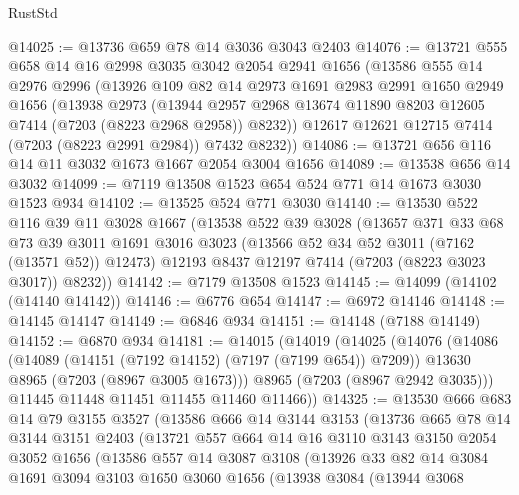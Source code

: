 \begin{lexlean}{RustStd}
\begin{coremodule}
@14025 := @13736 @659 @78 @14 @3036 @3043 @2403
@14076 := @13721
    @555
    @658
    @14
    @16
    @2998
    @3035
    @3042
    @2054
    @2941
    @1656
    (@13586
      @555
      @14
      @2976
      @2996
      (@13926
        @109
        @82
        @14
        @2973
        @1691
        @2983
        @2991
        @1650
        @2949
        @1656
        (@13938
          @2973
          (@13944 @2957 @2968 @13674 @11890 @8203 @12605 @7414 (@7203 (@8223 @2968 @2958)) @8232))
        @12617
        @12621
        @12715
        @7414
        (@7203 (@8223 @2991 @2984))
        @7432
        @8232))
@14086 := @13721 @656 @116 @14 @11 @3032 @1673 @1667 @2054 @3004 @1656
@14089 := @13538 @656 @14 @3032
@14099 := @7119 @13508 @1523 @654 @524 @771 @14 @1673 @3030 @1523 @934
@14102 := @13525 @524 @771 @3030
@14140 := @13530
    @522
    @116
    @39
    @11
    @3028
    @1667
    (@13538
      @522
      @39
      @3028
      (@13657
        @371
        @33
        @68
        @73
        @39
        @3011
        @1691
        @3016
        @3023
        (@13566 @52 @34 @52 @3011 (@7162 (@13571 @52)) @12473)
        @12193
        @8437
        @12197
        @7414
        (@7203 (@8223 @3023 @3017))
        @8232))
@14142 := @7179 @13508 @1523
@14145 := @14099 (@14102 (@14140 @14142))
@14146 := @6776 @654
@14147 := @6972 @14146
@14148 := @14145 @14147
@14149 := @6846 @934
@14151 := @14148 (@7188 @14149)
@14152 := @6870 @934
@14181 := @14015
    (@14019
      (@14025
        (@14076
          (@14086
            (@14089 (@14151 (@7192 @14152) (@7197 (@7199 @654)) @7209))
            @13630
            @8965
            (@7203 (@8967 @3005 @1673)))
          @8965
          (@7203 (@8967 @2942 @3035)))
        @11445
        @11448
        @11451
        @11455
        @11460
        @11466))
@14325 := @13530
    @666
    @683
    @14
    @79
    @3155
    @3527
    (@13586
      @666
      @14
      @3144
      @3153
      (@13736
        @665
        @78
        @14
        @3144
        @3151
        @2403
        (@13721
          @557
          @664
          @14
          @16
          @3110
          @3143
          @3150
          @2054
          @3052
          @1656
          (@13586
            @557
            @14
            @3087
            @3108
            (@13926
              @33
              @82
              @14
              @3084
              @1691
              @3094
              @3103
              @1650
              @3060
              @1656
              (@13938
                @3084
                (@13944
                  @3068

\end{coremodule}
\end{lexlean}
